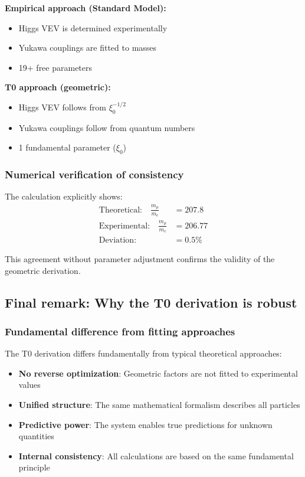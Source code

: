 \textbf{Empirical approach (Standard Model):}
\begin{itemize}
	\item Higgs VEV is determined experimentally
	\item Yukawa couplings are fitted to masses
	\item 19+ free parameters
\end{itemize}

\textbf{T0 approach (geometric):}
\begin{itemize}
	\item Higgs VEV follows from $\xi_0^{-1/2}$
	\item Yukawa couplings follow from quantum numbers
	\item 1 fundamental parameter ($\xi_0$)
\end{itemize}

\subsubsection{Numerical verification of consistency}

The calculation explicitly shows:
\begin{align}
	\text{Theoretical:} \quad \frac{m_\mu}{m_e} &= 207.8\\
	\text{Experimental:} \quad \frac{m_\mu}{m_e} &= 206.77\\
	\text{Deviation:} \quad &= 0.5\%
\end{align}

This agreement without parameter adjustment confirms the validity of the geometric derivation.

\subsection{Final remark: Why the T0 derivation is robust}

\subsubsection{Fundamental difference from fitting approaches}

The T0 derivation differs fundamentally from typical theoretical approaches:

\begin{itemize}
	\item \textbf{No reverse optimization}: Geometric factors are not fitted to experimental values
	\item \textbf{Unified structure}: The same mathematical formalism describes all particles
	\item \textbf{Predictive power}: The system enables true predictions for unknown quantities
	\item \textbf{Internal consistency}: All calculations are based on the same fundamental principle
\end{itemize}

